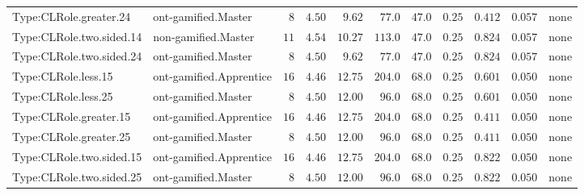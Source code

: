 \documentclass[6pt,a4paper]{article}
\begin{document}
{\begin{longtable}{llrrrrrrrrl}
Type:CLRole.greater.24&ont-gamified.Master&$ 8$&$4.50$&$ 9.62$&$ 77.0$&$ 47.0$&$ 0.25$&$0.412$&$0.057$&none\tabularnewline
Type:CLRole.two.sided.14&non-gamified.Master&$11$&$4.54$&$10.27$&$113.0$&$ 47.0$&$ 0.25$&$0.824$&$0.057$&none\tabularnewline
Type:CLRole.two.sided.24&ont-gamified.Master&$ 8$&$4.50$&$ 9.62$&$ 77.0$&$ 47.0$&$ 0.25$&$0.824$&$0.057$&none\tabularnewline
Type:CLRole.less.15&ont-gamified.Apprentice&$16$&$4.46$&$12.75$&$204.0$&$ 68.0$&$ 0.25$&$0.601$&$0.050$&none\tabularnewline
Type:CLRole.less.25&ont-gamified.Master&$ 8$&$4.50$&$12.00$&$ 96.0$&$ 68.0$&$ 0.25$&$0.601$&$0.050$&none\tabularnewline
Type:CLRole.greater.15&ont-gamified.Apprentice&$16$&$4.46$&$12.75$&$204.0$&$ 68.0$&$ 0.25$&$0.411$&$0.050$&none\tabularnewline
Type:CLRole.greater.25&ont-gamified.Master&$ 8$&$4.50$&$12.00$&$ 96.0$&$ 68.0$&$ 0.25$&$0.411$&$0.050$&none\tabularnewline
\newpage
Type:CLRole.two.sided.15&ont-gamified.Apprentice&$16$&$4.46$&$12.75$&$204.0$&$ 68.0$&$ 0.25$&$0.822$&$0.050$&none\tabularnewline
Type:CLRole.two.sided.25&ont-gamified.Master&$ 8$&$4.50$&$12.00$&$ 96.0$&$ 68.0$&$ 0.25$&$0.822$&$0.050$&none\tabularnewline
\hline
\end{longtable}}
\end{document}
